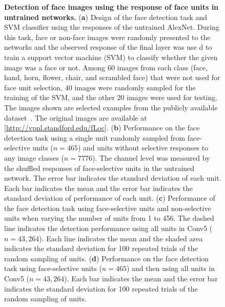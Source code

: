 \documentclass[sn-mathphys]{sn-jnl}%
\theoremstyle{thmstyleone}%
\theoremstyle{thmstyletwo}%
\theoremstyle{thmstylethree}%
\begin{document}
\begin{figure}[htbp]
	
	\centering
	\caption{
		\textbf{Detection of face images using the response of face units in untrained networks.
		}
		(\textbf{a}) Design of the face detection task and SVM classifier using the responses of the untrained AlexNet.
		During this task, face or non-face images were randomly presented to the networks and the observed response of the final layer was use d to train a support vector machine (SVM) to classify whether the given image was a face or not.
		Among 60 images from each class (face, hand, horn, flower, chair, and scrambled face) that were not used for face unit selection, 40 images were randomly sampled for the training of the SVM, and the other 20 images were used for testing.
		The images shown are selected examples from the publicly available dataset~\cite{stigliani2015temporal}.
		The original images are available at [\url{http://vpnl.standford.edu/fLoc}].
		(\textbf{b}) Performance on the face detection task using a single unit randomly sampled from face-selective units ($ n = 465 $) and units without selective responses to any image classes ($ n = 7776 $).
		The channel level was measured by the shuffled responses of face-selective units in the untrained network.
		The error bar indicates the standard deviation of each unit.
		Each bar indicates the mean and the error bar indicates the standard deviation of performance of each unit.
		(\textbf{c}) Performance of the face detection task using face-selective units and non-selective units when varying the number of units from 1 to 456.
		The dashed line indicates the detection performance using all units in Conv5 ($ n=43,264 $).
		Each line indicates the mean and the shaded area indicates the standard deviation for 100 repeated trials of the random sampling of units.
		(\textbf{d}) Performance on the face detection task using face-selective units ($ n=465 $) and then using all units in Conv5 ($ n=43,264 $).
		Each bar indicates the mean and the error bar indicates the standard deviation for 100 repeated trials of the random sampling of units.
	}
	\label{fig:detection}
\end{figure}
\end{document}

